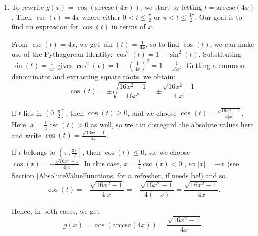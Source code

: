 \documentclass{ximera}
\begin{document}
\begin{example}
\begin{explanation}
\begin{enumerate}
\begin{enumerate}
To relate $\sec(t)$ to $\tan(t)$, we use the Pythagorean Identity: $\tan^{2}(t) = \sec^{2}(t)-1 = x^2 - 1$ so that  $\tan(t) = \pm \sqrt{x^2-1}$. Since $t$ lies in $\left[0, \frac{\pi}{2} \right) \cup \left[\pi, \frac{3\pi}{2} \right)$, $\tan(t) \geq 0$, so we choose $\tan(t) = \sqrt{x^2-1}$.  Hence,  $f(x) = \tan(\text{arcsec}(x)) = \sqrt{x^2-1}$.  

 

For the domain of $f$,  we note that the domain of $\text{arcsec}(x)$ is $(-\infty, -1] \cup [1, \infty)$.  Since all values in the range of arcsecant,  $\left[0, \frac{\pi}{2} \right) \cup \left[\pi, \frac{3\pi}{2} \right)$, are in the domain of the tangent function, we find the domain of $f$ is $(-\infty, -1] \cup [1,\infty)$.

\item To rewrite  $g(x) = \cos(\text{arccsc}(4x))$, we start by letting $t = \text{arccsc}(4x)$.   Then $\csc(t) = 4x$ where either $0 < t \leq \frac{\pi}{2}$  or $\pi< t \leq \frac{3\pi}{2}$.  Our goal is to find an expression for $\cos(t)$ in terms of $x$.

 


 From $\csc(t) = 4x$, we get $\sin(t) = \frac{1}{4x}$, so to find $\cos(t)$, we can make use of the Pythagorean Identity: $\cos^{2}(t)  = 1 - \sin^{2}(t)$.  Substituting $\sin(t) = \frac{1}{4x}$  gives $\cos^{2}(t) = 1 -  \left(\frac{1}{4x}\right)^2 = 1 - \frac{1}{16x^2}$.  Getting a common denominator and extracting square roots, we obtain: \[\cos(t) = \pm \sqrt{\frac{16x^2-1}{16x^2}} = \pm \frac{\sqrt{16x^2-1}}{4|x|}.\]

If $t$ lies in $\left(0, \frac{\pi}{2} \right]$, then $\cos(t) \geq 0$, and we choose  $\cos(t) = \frac{\sqrt{16x^2-1}}{4|x|}$.  Here, $x = \frac{1}{4} \csc(t) > 0$ as well, so we can disregard the absolute values here and write $\cos(t) = \frac{\sqrt{16x^2-1}}{4x}$.

 


If $t$ belongs to $\left( \pi, \frac{3\pi}{2} \right]$, then  $\cos(t) \leq 0$, so, we choose $\cos(t) = -\frac{\sqrt{16x^2-1}}{4|x|}$.  In this case, $x = \frac{1}{4} \csc(t) < 0$ , so $|x| = -x$ (see Section \ref{AbsoluteValueFunctions} for a refresher, if needs be!) and so,  \[\cos(t) = -\frac{\sqrt{16x^2-1}}{4|x|} =  -\frac{\sqrt{16x^2-1}}{4(-x)} = \frac{\sqrt{16x^2-1}}{4x}.\]

Hence, in both cases, we get \[ g(x) = \cos(\text{arccsc}(4x)) = \frac{\sqrt{16x^2-1}}{4x}.\]

  
 


\end{enumerate}
\end{enumerate}
\end{explanation}
\end{example}
\end{document}

